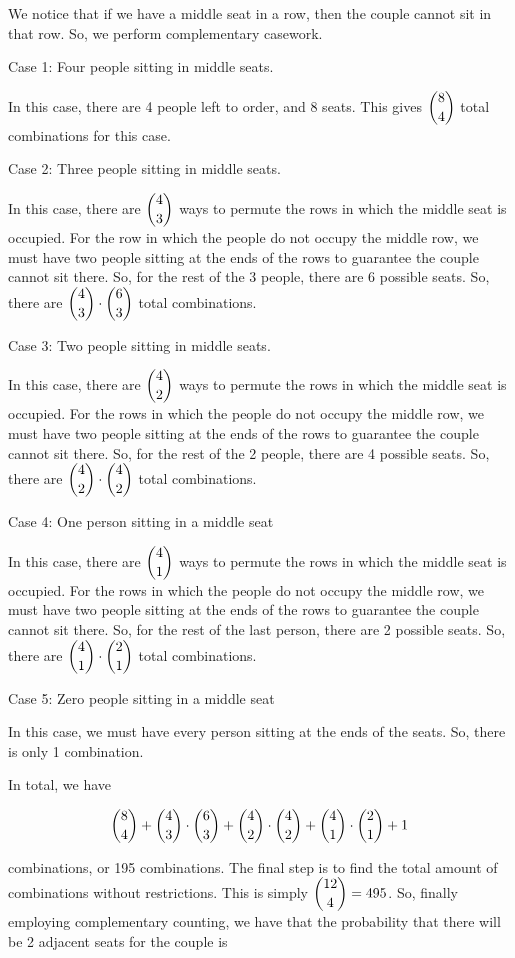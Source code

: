 \begin{enumerate}
We notice that if we have a middle seat in a row, then the couple cannot sit in that row. So, we perform complementary casework. 

 Case 1: Four people sitting in middle seats. 

 In this case, there are 4 people left to order, and 8 seats. This gives $\dbinom{8}{4}$ total combinations for this case. 

 Case 2: Three people sitting in middle seats.

 In this case, there are $\dbinom{4}{3}$ ways to permute the rows in which the middle seat is occupied. For the row in which the people do not occupy the middle row, we must have two people sitting at the ends of the rows to guarantee the couple cannot sit there. So, for the rest of the 3 people, there are 6 possible seats. So, there are $\dbinom{4}{3} \cdot \dbinom{6}{3}$ total combinations. 

 Case 3: Two people sitting in middle seats. 

 In this case, there are $\dbinom{4}{2}$ ways to permute the rows in which the middle seat is occupied. For the rows in which the people do not occupy the middle row, we must have two people sitting at the ends of the rows to guarantee the couple cannot sit there. So, for the rest of the 2 people, there are 4 possible seats. So, there are $\dbinom{4}{2} \cdot \dbinom{4}{2}$ total combinations.  

 Case 4: One person sitting in a middle seat 

 In this case, there are $\dbinom{4}{1}$ ways to permute the rows in which the middle seat is occupied. For the rows in which the people do not occupy the middle row, we must have two people sitting at the ends of the rows to guarantee the couple cannot sit there. So, for the rest of the last person, there are 2 possible seats. So, there are $\dbinom{4}{1} \cdot \dbinom{2}{1}$ total combinations.   

 Case 5: Zero people sitting in a middle seat

 In this case, we must have every person sitting at the ends of the seats. So, there is only 1 combination.  

 In total, we have 

 
 \[\dbinom{8}{4} + \dbinom{4}{3} \cdot \dbinom{6}{3} + \dbinom{4}{2} \cdot \dbinom{4}{2} + \dbinom{4}{1} \cdot \dbinom{2}{1} +1\] 

 combinations, or 195 combinations. The final step is to find the total amount of combinations without restrictions. This is simply $\dbinom{12}{4} = 495$. So, finally employing complementary counting, we have that the probability that there will be 2 adjacent seats for the couple is 


\end{enumerate}
